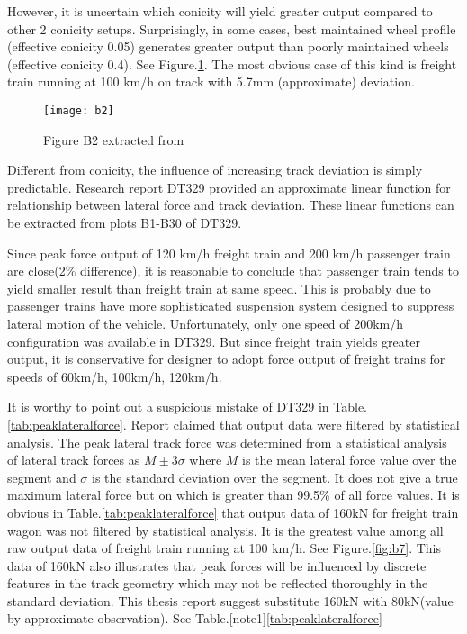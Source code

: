 However, it is uncertain which conicity will yield greater output compared to other 2 conicity setups. Surprisingly, in some cases, best maintained wheel profile (effective conicity 0.05) generates greater output than poorly maintained wheels (effective conicity 0.4). See Figure.\ref{fig:b2}. The most obvious case of this kind is freight train running at 100 km/h on track with 5.7mm (approximate) deviation.

\begin{figure}[h!]
    \centering
    \texttt{[image: b2]}
    \caption{Figure B2 extracted from \citet{d181dt329}}
    \label{fig:b2}
\end{figure}

Different from conicity, the influence of increasing track deviation is simply predictable. Research report DT329 provided an approximate linear function for relationship between lateral force and track deviation. These linear functions can be extracted from plots B1-B30 of DT329.

Since peak force output of 120 km/h freight train and 200 km/h passenger train are close(2\% difference), it is reasonable to conclude that passenger train tends to yield smaller result than freight train at same speed. This is probably due to passenger trains have more sophisticated suspension system designed to suppress lateral motion of the vehicle. Unfortunately, only one speed of 200km/h configuration was available in DT329. But since freight train yields greater output, it is conservative for designer to adopt force output of freight trains for speeds of 60km/h, 100km/h, 120km/h.

It is worthy to point out a suspicious mistake of DT329 in Table.\ref{tab:peaklateralforce}. Report claimed that output data were filtered by statistical analysis. The peak lateral track force was determined from a statistical analysis of lateral track forces as $M \pm 3\sigma$ where $M$ is the mean lateral force value over the segment and $\sigma$ is the standard deviation over the segment. It does not give a true maximum lateral force but on which is greater than 99.5\% of all force values. It is obvious in Table.\ref{tab:peaklateralforce} that output data of 160kN for freight train wagon was not filtered by statistical analysis. It is the greatest value among all raw output data of freight train running at 100 km/h. See Figure.\ref{fig:b7}. This data of 160kN also illustrates that 
peak forces will be influenced by discrete features in the track geometry which may not be reflected thoroughly in the standard deviation. This thesis report suggest substitute 160kN with 80kN(value by approximate observation). See Table.[note1]\ref{tab:peaklateralforce}

